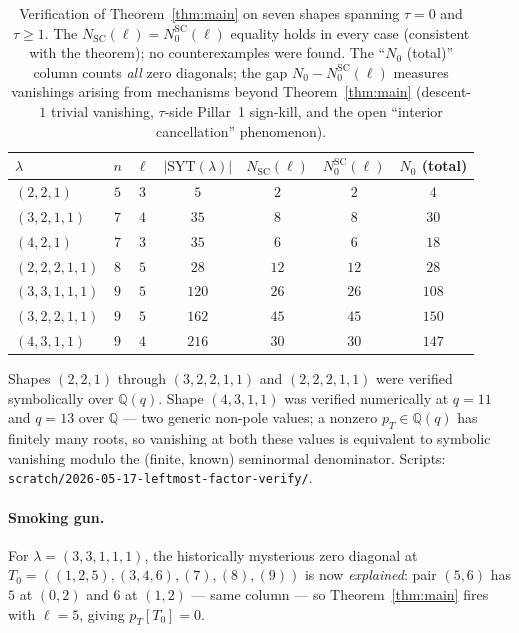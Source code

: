 \documentclass[11pt]{article}
\theoremstyle{definition}
\newcommand{\SYT}{\mathrm{SYT}}
\newcommand{\pT}{p_T}
\begin{document}
\begin{table}[h]
\centering\renewcommand{\arraystretch}{1.2}
\caption{Verification of Theorem~\ref{thm:main} on seven shapes spanning
$\tau = 0$ and $\tau \ge 1$. The
$N_{\mathrm{SC}}(\ell) = N_0^{\mathrm{SC}}(\ell)$ equality holds in every
case (consistent with the theorem); no counterexamples were found. The
``$N_0$ (total)'' column counts \emph{all} zero diagonals; the gap
$N_0 - N_0^{\mathrm{SC}}(\ell)$ measures vanishings arising from
mechanisms beyond Theorem~\ref{thm:main} (descent-$1$ trivial vanishing,
$\tau$-side Pillar~1 sign-kill, and the open ``interior cancellation''
phenomenon).}
\begin{tabular}{lcccccc}
\toprule
$\lambda$ & $n$ & $\ell$ & $|\SYT(\lambda)|$ &
   $N_{\mathrm{SC}}(\ell)$ & $N_0^{\mathrm{SC}}(\ell)$ &
   $N_0$ (total) \\
\midrule
$(2,2,1)$     & $5$ & $3$ & $5$   & $2$  & $2$  & $4$   \\
$(3,2,1,1)$   & $7$ & $4$ & $35$  & $8$  & $8$  & $30$  \\
$(4,2,1)$     & $7$ & $3$ & $35$  & $6$  & $6$  & $18$  \\
$(2,2,2,1,1)$ & $8$ & $5$ & $28$  & $12$ & $12$ & $28$  \\
$(3,3,1,1,1)$ & $9$ & $5$ & $120$ & $26$ & $26$ & $108$ \\
$(3,2,2,1,1)$ & $9$ & $5$ & $162$ & $45$ & $45$ & $150$ \\
$(4,3,1,1)$   & $9$ & $4$ & $216$ & $30$ & $30$ & $147$ \\
\bottomrule
\end{tabular}
\end{table}

\noindent{}Shapes $(2,2,1)$ through $(3,2,2,1,1)$ and $(2,2,2,1,1)$ were
verified symbolically over $\mathbb{Q}(q)$. Shape $(4,3,1,1)$ was
verified numerically at $q = 11$ and $q = 13$ over $\mathbb{Q}$ — two
generic non-pole values; a nonzero $p_T \in \mathbb{Q}(q)$ has finitely
many roots, so vanishing at both these values is equivalent to symbolic
vanishing modulo the (finite, known) seminormal denominator. Scripts:
\texttt{scratch/2026-05-17-leftmost-factor-verify/}.

\paragraph{Smoking gun.} For $\lambda = (3,3,1,1,1)$, the historically
mysterious zero diagonal at
$T_0 = ((1,2,5),(3,4,6),(7),(8),(9))$ is now \emph{explained}: pair
$(5,6)$ has $5$ at $(0,2)$ and $6$ at $(1,2)$ — same column — so
Theorem~\ref{thm:main} fires with $\ell = 5$, giving $\pT[T_0] = 0$.
\end{document}
